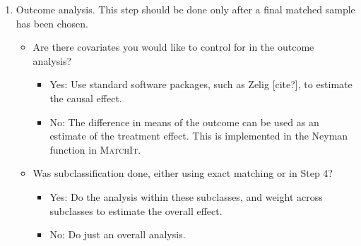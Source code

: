 \documentclass[11pt,titlepage]{article}
\newcommand{\MatchIt}{\textsc{MatchIt}}
\begin{document}
\begin{enumerate}
\item  Outcome analysis.  This step should be done only after a final matched sample has been chosen.
\begin{itemize} 
		\item Are there covariates you would like to control for in the outcome analysis?
        \begin{itemize} \item Yes: Use standard software packages, such as Zelig [cite?], to estimate the causal effect.
                        \item No: The difference in means of the outcome can be used as an estimate of the treatment effect.  This is 
		implemented in the Neyman function in \MatchIt.
	\end{itemize}
		\item Was subclassification done, either using exact matching or in Step 4?
        \begin{itemize} \item Yes: Do the analysis within these subclasses, and weight across subclasses to estimate the overall effect.
                        \item No: Do just an overall analysis.
        \end{itemize}                                                                                                                                                     

\end{itemize}
\end{enumerate}                                                                                                                                                             



 
\end{document}
